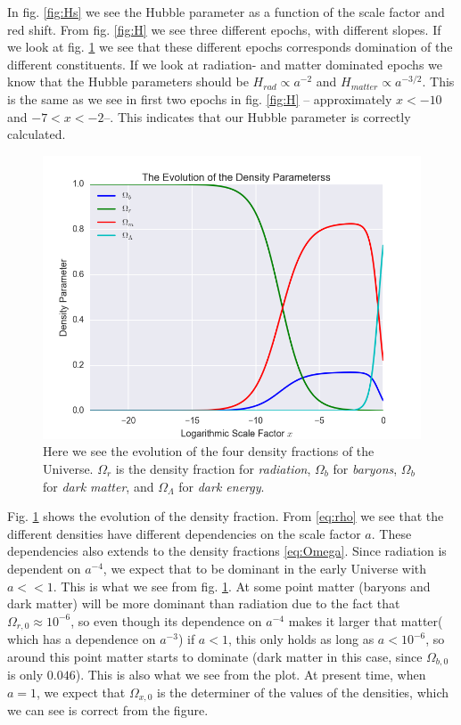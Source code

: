 \documentclass[a4paper,norsk, 10pt]{article}
\begin{document}
In fig. \ref{fig:Hs} we see the Hubble parameter as a function of the scale factor and red shift. From fig. \ref{fig:H} we see three different epochs, with different slopes. If we look at fig. \ref{fig:omega} we see that these different epochs corresponds domination of the different constituents. If we look at radiation- and matter dominated epochs we know that the Hubble parameters should be $H_{rad} \propto a^{-2}$ and $H_{matter} \propto a^{-3/2}$. This is the same as we see in first two epochs in fig. \ref{fig:H} -- approximately $x < -10$ and $-7<x<-2$--. This indicates that our Hubble parameter is correctly calculated.


\begin{figure}[ht]
     \centering
	{\includegraphics[scale=0.5]{Omega.png}
	\caption{Here we see the evolution of the four density fractions of the Universe. $\Omega_r$ is the density fraction for \textit{radiation}, $\Omega_b$ for \textit{baryons}, $\Omega_b$ for \textit{dark matter}, and $\Omega_{\Lambda}$ for \textit{dark energy}.}\label{fig:omega}}
\end{figure}



Fig. \ref{fig:omega} shows the evolution of the density fraction. From \ref{eq:rho} we see that the different densities have different dependencies on the scale factor $a$. These dependencies also extends to the density fractions \ref{eq:Omega}. Since radiation is dependent on $a^{-4}$, we expect that to be dominant in the early Universe with $a << 1$. This is what we see from fig. \ref{fig:omega}. At some point matter (baryons and dark matter) will be more dominant than radiation due to the fact that $\Omega_{r,0} \approx 10^{-6}$, so even though its dependence on $a^{-4}$ makes it larger that matter( which has a dependence on $a^{-3}$) if $a<1$, this only holds as long as $a < 10^{-6}$, so around this point matter starts to dominate (dark matter in this case, since $\Omega_{b,0}$ is only $0.046$). This is also what we see from the plot. At present time, when $a=1$, we expect that $\Omega_{x,0}$ is the determiner of the values of the densities, which we can see is correct from the figure.
\end{document}
